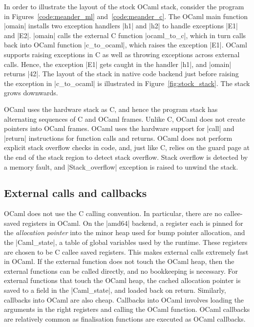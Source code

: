 \documentclass[sigplan,10pt,review,anonymous]{acmart}\settopmatter{printfolios=true,printccs=false,printacmref=false}
\begin{document}
In order to illustrate the layout of the stock OCaml stack, consider the
program in Figures~\ref{code:meander_ml} and~\ref{code:meander_c}. The OCaml
main function |omain| installs two exception handlers |h1| and |h2| to handle
exceptions |E1| and |E2|. |omain| calls the external C function |ocaml_to_c|,
which in turn calls back into OCaml function |c_to_ocaml|, which raises the
exception |E1|. OCaml supports raising exceptions in C as well as throwing
exceptions across external calls. Hence, the exception |E1| gets caught in the
handler |h1|, and |omain| returns |42|. The layout of the stack in native code
backend just before raising the exception in |c_to_ocaml| is illustrated in
Figure~\ref{fig:stock_stack}. The stack grows downwards.

OCaml uses the hardware stack as C, and hence the program stack has alternating
sequences of C and OCaml frames. Unlike C, OCaml does not create pointers into
OCaml frames. OCaml uses the hardware support for |call| and |return|
instructions for function calls and returns. OCaml does not perform explicit
stack overflow checks in code, and, just like C, relies on the guard page at
the end of the stack region to detect stack overflow. Stack overflow is
detected by a memory fault, and |Stack_overflow| exception is raised to unwind
the stack.

\subsection{External calls and callbacks}

OCaml does not use the C calling convention. In particular, there are no
callee-saved registers in OCaml. On the |amd64| backend, a register each is
pinned for the \emph{allocation pointer} into the minor heap used for bump
pointer allocation, and the |Caml_state|, a table of global variables used by
the runtime. These registers are chosen to be C callee saved registers. This
makes external calls extremely fast in OCaml. If the external function does not
touch the OCaml heap, then the external functions can be called directly, and
no bookkeeping is necessary. For external functions that touch the OCaml heap,
the cached allocation pointer is saved to a field in the |Caml_state|, and
loaded back on return. Similarly, callbacks into OCaml are also cheap.
Callbacks into OCaml involves loading the arguments in the right registers and
calling the OCaml function. OCaml callbacks are relatively common as
finalisation functions are executed as OCaml callbacks.
\end{document}
